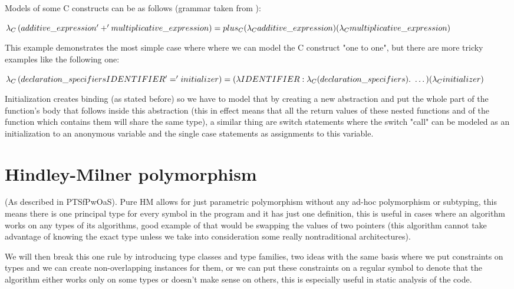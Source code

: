 Models of some C constructs can be as follows (grammar taken from ): %

$
    \lambda_C\left(additive\_expression '+' multiplicative\_expression\right) = \\
    plus_C (\lambda_C additive\_expression) (\lambda_C multiplicative\_expression)
$

This example demonstrates the most simple case where  where we can model the C construct "one to one",
but there are more tricky examples like the following one:

$
    \lambda_C\left(declaration\_specifiers IDENTIFIER '=' initializer\right) = \\
    (\lambda IDENTIFIER : \lambda_C(declaration\_specifiers) .\ \dots) (\lambda_C initializer)
$

Initialization creates binding (as stated before) so we have to model that by creating a new abstraction and put the whole
part of the function's body that follows inside this abstraction (this in effect means that all the return values of these nested functions
and of the function which contains them will share the same type), a similar thing are switch statements where the switch "call" can be modeled
as an initialization to an anonymous variable and the single case statements as assignments to this variable.


\section{Hindley-Milner polymorphism}

(As described in PTSfPwOaS).
Pure HM allows for just parametric polymorphism without any ad-hoc polymorphism
or subtyping, this means there is one principal type for every symbol in the program and it has just one definition, this is useful in cases
where an algorithm works on any types of its algorithms, good example of that would be swapping the values of two pointers (this algorithm cannot
take advantage of knowing the exact type unless we take into consideration some really nontraditional architectures).

We will then break this one
rule by introducing type classes and type families, two ideas with the same basis where we put constraints on types and we can
create non-overlapping instances for them, or we can put these constraints on a regular symbol to denote that the algorithm either works only on
some types or doesn't make sense on others, this is especially useful in static analysis of the code.

